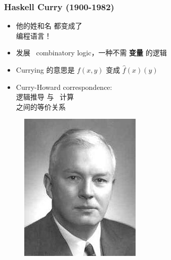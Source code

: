\documentclass[15pt]{beamer}
\begin{document}
\begin{frame}
\frametitle{Haskell Curry (1900-1982)}
\begin{minipage}[t]{0.62\linewidth}
	\begin{itemize}
		\item 他的姓和名 都变成了 \\编程语言！
		\item 发展 {\color{red} \ combinatory logic}，一种不需 \textbf{变量} 的逻辑
		\item Currying 的意思是 $f(x,y)$ 变成 $\hat{f}(x)(y)$
		\item Curry-Howard correspondence: \\
			{\color{red}逻辑推导} 与 {\color{red}\ 计算} \\
			之间的等价关系
	\end{itemize}
\end{minipage}
\hfill
\begin{minipage}[t]{0.35\linewidth}
	\begin{figure}[H]
		\includegraphics[scale=0.5]{Curry.jpg}
	\end{figure}
\end{minipage}
\end{frame}
\end{document}
